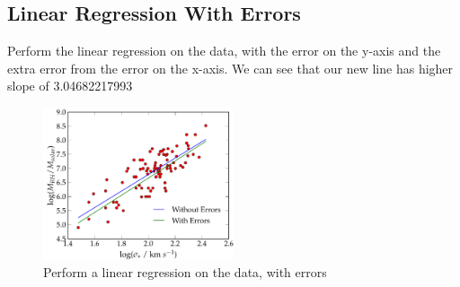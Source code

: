 \documentclass[11pt,letterpaper]{article}
\begin{document}
\newpage
\subsection{Linear Regression With Errors}

Perform the linear regression on the data, with the error on the y-axis and the extra error from the error on the x-axis. We can see that our new line has higher slope of 3.04682217993

\begin{figure}[h!]
	\centering
	\includegraphics[width=0.5\textwidth]{WithError}
	\caption{Perform a linear regression on the data, with errors}
	\label{fig:WithError}
\end{figure}
	
\end{document}
